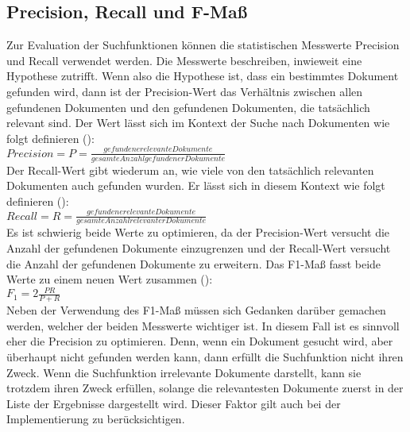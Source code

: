 \subsection{Precision, Recall und F-Maß}
Zur Evaluation der Suchfunktionen können die statistischen Messwerte Precision und Recall verwendet werden.
Die Messwerte beschreiben, inwieweit eine Hypothese zutrifft.
Wenn also die Hypothese ist, dass ein bestimmtes Dokument gefunden wird, dann ist der Precision-Wert das Verhältnis zwischen allen gefundenen Dokumenten und den gefundenen Dokumenten, die tatsächlich relevant sind.
Der Wert lässt sich im Kontext der Suche nach Dokumenten wie folgt definieren (\cite{Sirotkin_2012}):\\

\(Precision=P=\frac{gefundene relevante Dokumente}{gesamte Anzahl gefundener Dokumente} \)\\

Der Recall-Wert gibt wiederum an, wie viele von den tatsächlich relevanten Dokumenten auch gefunden wurden.
Er lässt sich in diesem Kontext wie folgt definieren (\cite{Sirotkin_2012}):\\

\(Recall=R=\frac{gefundene relevante Dokumente}{gesamte Anzahl relevanter Dokumente}\)\\

Es ist schwierig beide Werte zu optimieren, da der Precision-Wert versucht die Anzahl der gefundenen Dokumente einzugrenzen und der Recall-Wert versucht die Anzahl der gefundenen Dokumente zu erweitern.
Das F1-Maß fasst beide Werte zu einem neuen Wert zusammen (\cite{Sirotkin_2012}):\\

\(F_1=2\frac{PR}{P+R}\)\\

Neben der Verwendung des F1-Maß müssen sich Gedanken darüber gemachen werden, welcher der beiden Messwerte wichtiger ist.
In diesem Fall ist es sinnvoll eher die Precision zu optimieren.
Denn, wenn ein Dokument gesucht wird, aber überhaupt nicht gefunden werden kann, dann erfüllt die Suchfunktion nicht ihren Zweck.
Wenn die Suchfunktion irrelevante Dokumente darstellt, kann sie trotzdem ihren Zweck erfüllen, solange die relevantesten Dokumente zuerst in der Liste der Ergebnisse dargestellt wird.
Dieser Faktor gilt auch bei der Implementierung zu berücksichtigen.

